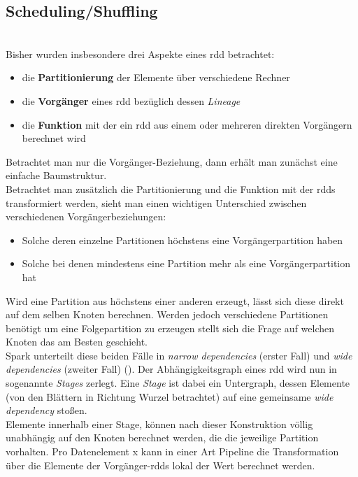 \subsection{Scheduling/Shuffling}\\

Bisher wurden insbesondere drei Aspekte eines \gls{rdd} betrachtet:
\begin{itemize}
	\item die \textbf{Partitionierung} der Elemente über verschiedene Rechner
	\item die \textbf{Vorgänger} eines \gls{rdd} bezüglich dessen \textit{Lineage}
	\item die \textbf{Funktion} mit der ein \gls{rdd} aus einem oder mehreren direkten Vorgängern berechnet wird
\end{itemize}

Betrachtet man nur die Vorgänger-Beziehung, dann erhält man zunächst eine einfache Baumstruktur.\\

Betrachtet man zusätzlich die Partitionierung und die Funktion mit der \glspl{rdd} transformiert werden, sieht man einen wichtigen Unterschied zwischen verschiedenen Vorgängerbeziehungen:
\begin{itemize}
\item Solche deren einzelne Partitionen höchstens eine Vorgängerpartition haben
\item Solche bei denen mindestens eine Partition mehr als eine Vorgängerpartition hat
\end{itemize}

Wird eine Partition aus höchstens einer anderen erzeugt, lässt sich diese direkt auf dem selben Knoten berechnen. Werden jedoch verschiedene Partitionen benötigt um eine Folgepartition zu erzeugen stellt sich die Frage auf welchen Knoten das am Besten geschieht.\\
Spark unterteilt diese beiden Fälle in \textit{narrow dependencies} (erster Fall) und \textit{wide dependencies} (zweiter Fall) (\cite{Mat12}). 
Der Abhängigkeitsgraph eines \gls{rdd} wird nun in sogenannte \textit{Stages} zerlegt. Eine \textit{Stage} ist dabei ein Untergraph, dessen Elemente (von den Blättern in Richtung Wurzel betrachtet) auf eine gemeinsame \textit{wide dependency} stoßen.\\

Elemente innerhalb einer Stage, können nach dieser Konstruktion völlig unabhängig auf den Knoten berechnet werden, die die jeweilige Partition vorhalten. Pro Datenelement x kann in einer Art Pipeline die Transformation über die Elemente der Vorgänger-\glspl{rdd} lokal der Wert berechnet werden.\\

